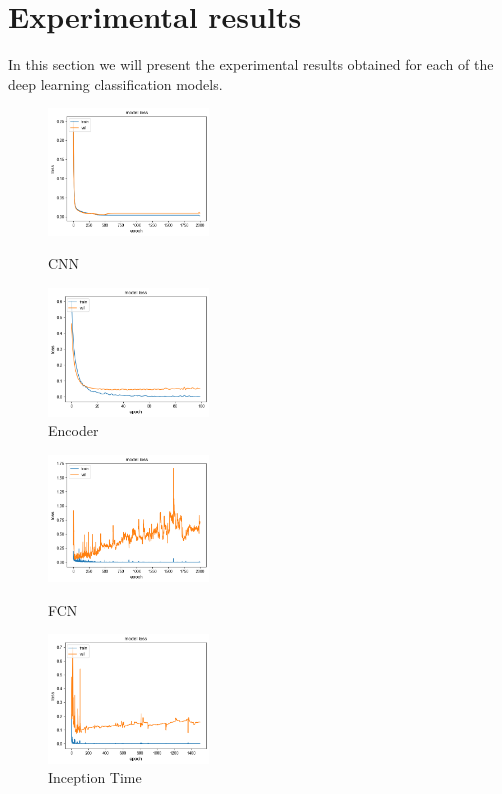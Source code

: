 \documentclass[conference]{IEEEtran}
\begin{document}
\section{Experimental results}
\label{sec:experimental-results}
In this section we will present the experimental results obtained for each of the deep learning classification models.
\begin{figure}[H]
  \centering
  \begin{minipage}[b]{4.25cm}
    \includegraphics[width=4.25cm]{cnnepochs_loss}
    \caption{CNN}
    \label{fig:cnn}
  \end{minipage}
  \hfill
  \begin{minipage}[b]{4.25cm}
    \includegraphics[width=4.25cm]{encoderepochs_loss}
    \caption{Encoder}
    \label{fig:encoder}
  \end{minipage}
\end{figure}

\begin{figure}[H]
  \centering
  \begin{minipage}[b]{4.25cm}
    \includegraphics[width=4.25cm]{fcnepochs_loss}
    \caption{FCN}
    \label{fig:fcn}
  \end{minipage}
  \hfill
  \begin{minipage}[b]{4.25cm}
    \includegraphics[width=4.25cm]{inceptionepochs_loss}
    \caption{Inception Time}
    \label{fig:inception}
  \end{minipage}
\end{figure}
\end{document}
